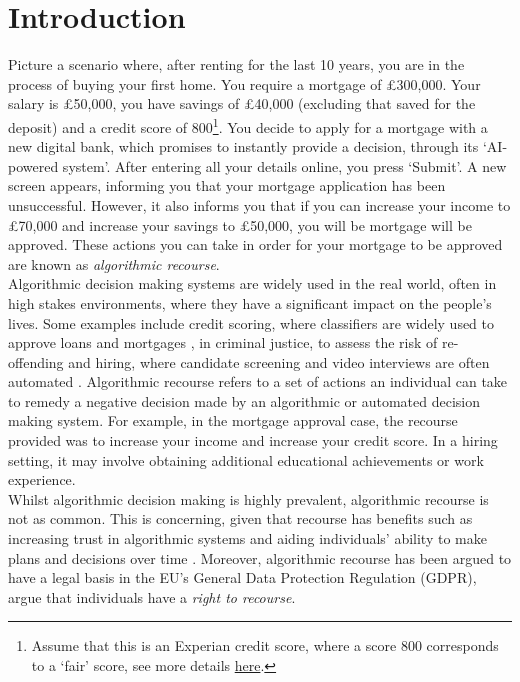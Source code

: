 \chapter{Introduction}

Picture a scenario where, after renting for the last 10 years, you are in the process of buying your first home. You require a mortgage of £300,000. Your salary is £50,000, you have savings of £40,000 (excluding that saved for the deposit) and a credit score of 800\footnote{Assume that this is an Experian credit score, where a score 800 corresponds to a `fair' score, see more details \href{https://www.experian.co.uk/consumer/experian-credit-score.html}{here}.}. You decide to apply for a mortgage with a new digital bank, which promises to instantly provide a decision, through its `AI-powered system'. After entering all your details online, you press `Submit'. A new screen appears, informing you that your mortgage application has been unsuccessful. However, it also informs you that if you can increase your income to £70,000 and increase your savings to £50,000, you will be mortgage will be approved. These actions you can take in order for your mortgage to be approved are known as \textit{algorithmic recourse}.\\

Algorithmic decision making systems are widely used in the real world, often in high stakes environments, where they have a significant impact on the people's lives. Some examples include credit scoring, where classifiers are widely used to approve loans and mortgages \citep{odwyerAreYouCreditworthy2018}, in criminal justice, to assess the risk of re-offending \citep{angwinMachineBias2016} and hiring, where candidate screening and video interviews are often automated \citep{kramerProblemsAIVideo2022}. Algorithmic recourse refers to a set of actions an individual can take to remedy a negative decision made by an algorithmic or automated decision making system. For example, in the mortgage approval case, the recourse provided was to increase your income and increase your credit score. In a hiring setting, it may involve obtaining additional educational achievements or work experience.\\


Whilst algorithmic decision making is highly prevalent, algorithmic recourse is not as common. This is concerning, given that recourse has benefits such as increasing trust in algorithmic systems and aiding individuals' ability to make plans and decisions over time \citep{venkatasubramanianPhilosophicalBasisAlgorithmic2020}. Moreover, algorithmic recourse has been argued to have a legal basis in the EU's General Data Protection Regulation (GDPR), \textcite{voigtEUGeneralData2017} argue that individuals have a \textit{right to recourse}.\\

